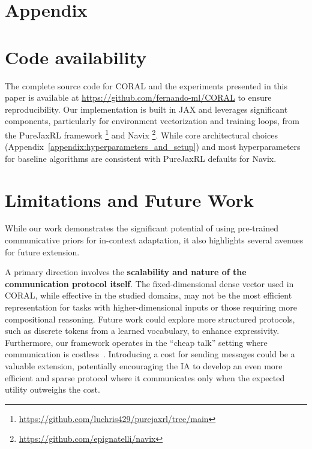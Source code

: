 \documentclass[letterpaper]{article} %
\begin{document}
\clearpage
\begin{appendix}
    
\setcounter{secnumdepth}{2}
\section*{Appendix}

\section{Code availability}
\label{appendix:code_availability}
The complete source code for CORAL and the experiments presented in this paper is available at \url{https://github.com/fernando-ml/CORAL} to ensure reproducibility. Our implementation is built in JAX \cite{jax2018github} and leverages significant components, particularly for environment vectorization and training loops, from the PureJaxRL framework \cite{lu2022discovered}\footnote{\url{https://github.com/luchris429/purejaxrl/tree/main}} and Navix \cite{pignatelli2024navix}\footnote{\url{https://github.com/epignatelli/navix}}. While core architectural choices (Appendix~\ref{appendix:hyperparameters_and_setup}) and most hyperparameters for baseline algorithms are consistent with PureJaxRL defaults for Navix.

\section{Limitations and Future Work}
While our work demonstrates the significant potential of using pre-trained communicative priors for in-context adaptation, it also highlights several avenues for future extension. 

A primary direction involves the \textbf{scalability and nature of the communication protocol itself}. The fixed-dimensional dense vector used in CORAL, while effective in the studied domains, may not be the most efficient representation for tasks with higher-dimensional inputs or those requiring more compositional reasoning. Future work could explore more structured protocols, such as discrete tokens from a learned vocabulary, to enhance expressivity. Furthermore, our framework operates in the ``cheap talk'' setting where communication is costless~\cite{crawford82signaling,lowe2019pitfalls, tao23pot, yang-tao25misinformation}. Introducing a cost for sending messages could be a valuable extension, potentially encouraging the IA to develop an even more efficient and sparse protocol where it communicates only when the expected utility outweighs the cost.


\end{appendix}
\end{document}
